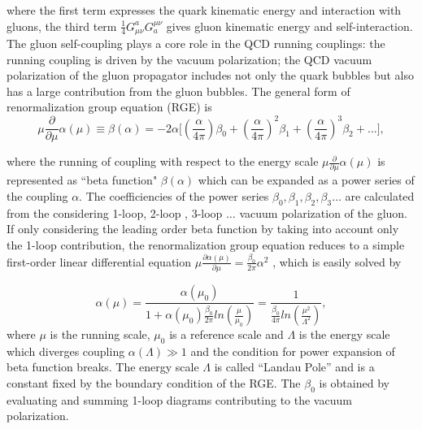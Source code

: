 \noindent where the first term expresses the quark kinematic energy and interaction with gluons, the third term $\frac{1}{4}G^a_{\mu\nu}G^{\mu\nu}_a$  gives gluon kinematic energy and self-interaction. The gluon self-coupling plays a core role in the QCD running couplings: the running coupling is driven by the vacuum polarization; the QCD vacuum polarization of the gluon propagator includes not only the quark bubbles but also has a large contribution from the gluon bubbles. The general form of renormalization group equation (RGE) is
\begin{equation}
	\mu \frac{\partial}{\partial \mu} \alpha(\mu) \equiv \beta(\alpha) = -2\alpha\big [  (\frac{\alpha}{4\pi}) \beta_0 +  (\frac{\alpha}{4\pi}) ^2 \beta_1  +  (\frac{\alpha}{4\pi}) ^3 \beta_2  + \dots \big], 
    \label{eqn:physics:qft:qcd:rge}
\end{equation}

\noindent where the running of coupling with respect to the energy scale $\mu \frac{\partial}{\partial \mu} \alpha(\mu) $ is represented as ``beta function" $\beta(\alpha)$ which can be expanded as a power series of the coupling $\alpha$. The coefficiencies of the power series $\beta_0, \beta_1 ,\beta_2  ,\beta_3 \dots $ are calculated from the considering 1-loop, 2-loop , 3-loop $\dots$ vacuum polarization of the gluon. If only considering the leading order beta function by taking into account only the 1-loop contribution, the renormalization group equation reduces to a simple first-order linear differential equation $\mu \frac{\partial \alpha(\mu) }{\partial \mu} = \frac{\beta_0}{2\pi} \alpha^2$ , which is easily solved by


\begin{equation}
	\alpha(\mu) = \frac{\alpha(\mu_0) }{1+\alpha(\mu_0) \frac{\beta_0}{2\pi}  ln(\frac{\mu}{\mu_0})}=\frac{1}{\frac{\beta_0}{4\pi}  ln(\frac{\mu^2}{\Lambda^2})},
    \label{eqn:physics:qft:qcd:zeroOrderRunning}
\end{equation}
\noindent where $\mu$ is the running scale, $\mu_0$ is a reference scale and $\Lambda$  is the energy scale which diverges coupling $\alpha(\Lambda) \gg 1$ and the condition for power expansion of beta function breaks. The energy scale $\Lambda$  is called ``Landau Pole'' and is a constant fixed by the boundary condition of the RGE. The $\beta_0$ is obtained by evaluating and summing 1-loop diagrams contributing to the vacuum polarization. 

